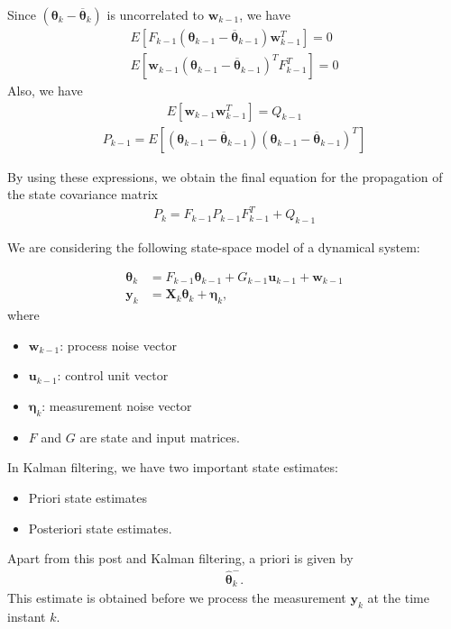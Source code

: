 Since $(\boldsymbol{\theta}_{k}-\overline{\boldsymbol{\theta}}_{k})$ is uncorrelated to $\mathbf{w}_{k-1}$, we have
\begin{align*}
	E[F_{k-1}(\boldsymbol{\theta}_{k-1}-\overline{\boldsymbol{\theta}}_{k-1})\mathbf{w}_{k-1}^{T}]=0 \\E[\mathbf{w}_{k-1}(\boldsymbol{\theta}_{k-1}-\overline{\boldsymbol{\theta}}_{k-1})^{T}F_{k-1}^{T}]=0
\end{align*}
Also, we have
\begin{align*}
	E[\mathbf{w}_{k-1}\mathbf{w}_{k-1}^{T}]=Q_{k-1}
\end{align*}
\begin{align*}
	P_{k-1}=E[(\boldsymbol{\theta}_{k-1}-\overline{\boldsymbol{\theta}}_{k-1})(\boldsymbol{\theta}_{k-1}-\overline{\boldsymbol{\theta}}_{k-1})^{T}]
\end{align*}

By using these expressions, we obtain the final equation for the propagation of the state covariance matrix
\begin{align*}
	P_{k}=F_{k-1}P_{k-1}F_{k-1}^{T}+Q_{k-1}
\end{align*}




We are considering the following state-space model of a dynamical system:

\begin{align*}
	\boldsymbol{\theta}_{k}&=F_{k-1}\boldsymbol{\theta}_{k-1}+G_{k-1}\mathbf{u}_{k-1}+\mathbf{w}_{k-1} \\
	\mathbf{y}_{k}& = \mathbf{X}_{k}\boldsymbol{\theta}_{k}+\boldsymbol{\eta}_{k},
\end{align*}
where
\begin{itemize}
	\item $\mathbf{w}_{k-1}$: process noise vector
	\item $\mathbf{u}_{k-1}$: control unit vector
	\item $\boldsymbol{\eta}_{k}$: measurement noise vector
	\item $F$ and $G$ are state and input matrices.
\end{itemize}


In Kalman filtering, we have two important state estimates: 
\begin{itemize}
	\item Priori state estimates
	\item Posteriori state estimates. 
\end{itemize}
Apart from this post and Kalman filtering, a priori is given by
\begin{align*}
	\hat{\boldsymbol{\theta}}_{k}^{-}.
\end{align*}
This estimate is obtained before we process the measurement $\mathbf{y}_{k}$ at the time instant $k$.

